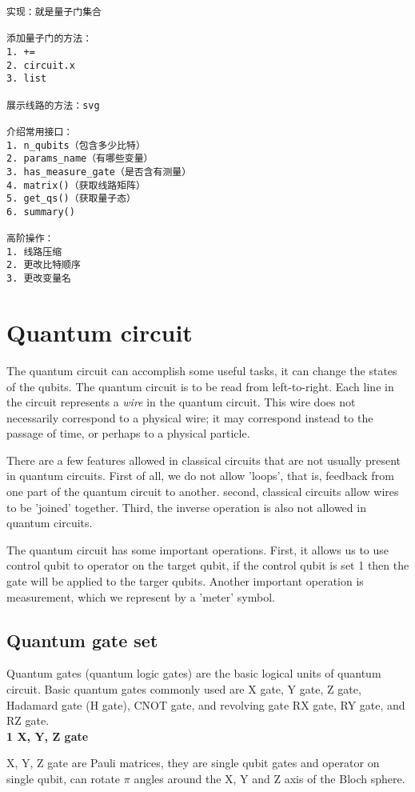 \begin{lstlisting}
实现：就是量子门集合

添加量子门的方法：
1. +=
2. circuit.x
3. list

展示线路的方法：svg

介绍常用接口：
1. n_qubits（包含多少比特）
2. params_name（有哪些变量）
3. has_measure_gate（是否含有测量）
4. matrix()（获取线路矩阵）
5. get_qs()（获取量子态）
6. summary()

高阶操作：
1. 线路压缩
2. 更改比特顺序
3. 更改变量名
\end{lstlisting}

\section{Quantum circuit}
The quantum circuit can accomplish some useful tasks, it can change the states of the qubits. The quantum circuit is to be read from left-to-right. Each line in the circuit represents a \textit{wire} in the quantum circuit. This wire does not necessarily correspond to a physical wire; it may correspond instead to the passage of time, or perhaps to a physical particle. 

There are a few features allowed in classical circuits that are not usually present in quantum circuits. First of all, we do not allow 'loops', that is, feedback from one part of the quantum circuit to another. second, classical circuits allow wires to be 'joined' together. Third, the inverse operation is also not allowed in quantum circuits.

The quantum circuit has some important operations. First, it allows us to use control qubit to operator on the target qubit, if the control qubit is set 1 then the gate will be applied to the targer qubits. Another important operation is measurement, which we represent by a 'meter' symbol.  
 
\subsection{Quantum gate set}
Quantum gates (quantum logic gates) are the basic logical units of quantum circuit. Basic quantum gates commonly used are X gate, Y gate, Z gate, Hadamard gate (H gate), CNOT gate, and revolving gate RX gate, RY gate, and RZ gate. \\

\textbf{1 X, Y, Z gate}

X, Y, Z gate are Pauli matrices, they are single qubit gates and operator on single qubit, can rotate $\pi$ angles around the X, Y and Z axis of the Bloch sphere.   \\

